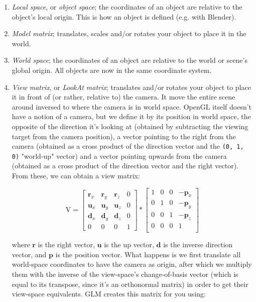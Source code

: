 \documentclass[table, xcdraw]{article}%
\begin{document}
\begin{enumerate}
    \item \emph{Local space}, or \emph{object space}; the coordinates of an object are relative to the object's local origin. This is how an object is defined (e.g. with Blender).
    \item[\large$\downarrow$] \emph{Model matrix}; translates, scales and/or rotates your object to place it in the world.
    \item \emph{World space}; the coordinates of an object are relative to the world or scene's global origin. All objects are now in the same coordinate system.
    \item[\large$\downarrow$] \emph{View matrix}, or \emph{LookAt matrix}; translates and/or rotates your object to place it in front of (or rather, relative to) the camera. It move the entire scene around inversed to where the camera is in world space. OpenGL itself doesn't have a notion of a camera, but we define it by its position in world space, the opposite of the direction it's looking at (obtained by subtracting the viewing target from the camera position), a vector pointing to the right from the camera (obtained as a cross product of the direction vector and the \texttt{(0, 1, 0)} "world-up" vector) and a vector pointing upwards from the camera (obtained as a cross product of the direction vector and the right vector). From these, we can obtain a view matrix:
    
    \begin{equation}
    \text{V} = \begin{bmatrix}
        \bm{r}_x & \bm{r}_y & \bm{r}_z & 0\\
        \bm{u}_x & \bm{u}_y & \bm{u}_z & 0\\
        \bm{d}_x & \bm{d}_y & \bm{d}_z & 0\\
        0        & 0        & 0        & 1
        \end{bmatrix} *
        \begin{bmatrix}
        1 & 0 & 0 & -\bm{p}_x\\
        0 & 1 & 0 & -\bm{p}_y\\
        0 & 0 & 1 & -\bm{p}_z\\
        0 & 0 & 0 & 1\\
        \end{bmatrix}
    \end{equation}
    
    where $\bm{r}$ is the right vector, $\bm{u}$ is the up vector, $\bm{d}$ is the inverse direction vector, and $\bm{p}$ is the position vector. What happens is we first translate all world-space coordinates to have the camera as origin, after which we multiply them with the inverse of the view-space's change-of-basis vector (which is equal to its transpose, since it's an orthonormal matrix) in order to get their view-space equivalents. GLM creates this matrix for you using:
    

\end{enumerate}
\end{document}
